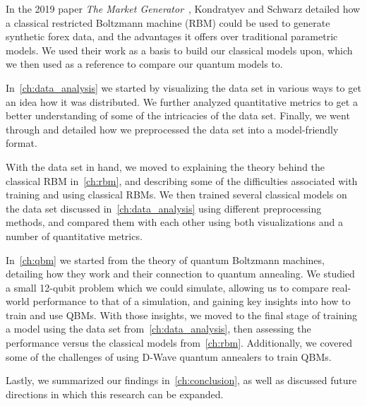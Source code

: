 In the 2019 paper \textit{The Market Generator}~\cite{kondratyev_2019}, Kondratyev and Schwarz detailed how a classical restricted Boltzmann machine (RBM) could be used to generate synthetic forex data, and the advantages it offers over traditional parametric models.
We used their work as a basis to build our classical models upon, which we then used as a reference to compare our quantum models to.

In~\cref{ch:data_analysis} we started by visualizing the data set in various ways to get an idea how it was distributed.
We further analyzed quantitative metrics to get a better understanding of some of the intricacies of the data set.
Finally, we went through and detailed how we preprocessed the data set into a model-friendly format.

With the data set in hand, we moved to explaining the theory behind the classical RBM in~\cref{ch:rbm}, and describing some of the difficulties associated with training and using classical RBMs.
We then trained several classical models on the data set discussed in~\cref{ch:data_analysis} using different preprocessing methods, and compared them with each other using both visualizations and a number of quantitative metrics.

In~\cref{ch:qbm} we started from the theory of quantum Boltzmann machines, detailing how they work and their connection to quantum annealing.
We studied a small 12-qubit problem which we could simulate, allowing us to compare real-world performance to that of a simulation, and gaining key insights into how to train and use QBMs.
With those insights, we moved to the final stage of training a model using the data set from~\cref{ch:data_analysis}, then assessing the performance versus the classical models from~\cref{ch:rbm}.
Additionally, we covered some of the challenges of using D-Wave quantum annealers to train QBMs.

Lastly, we summarized our findings in~\cref{ch:conclusion}, as well as discussed future directions in which this research can be expanded.
